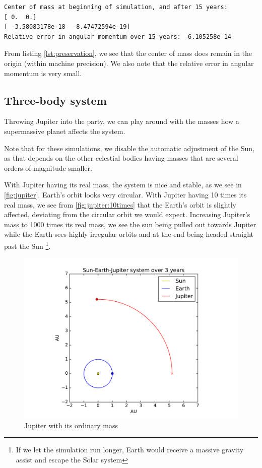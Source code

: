 \documentclass[a4paper]{article}
\begin{document}
\begin{lstlisting}[basicstyle=\footnotesize, frame=single, label={lst:preservation},caption=Preservation of center of mass and angular momentum]
Center of mass at beginning of simulation, and after 15 years:
[ 0.  0.]
[ -3.58083178e-18  -8.47472594e-19]
Relative error in angular momentum over 15 years: -6.105258e-14
\end{lstlisting}

From listing \vref{lst:preservation}, we see that the center of mass does remain in the origin (within machine precision). We also note that the relative error in angular momentum is very small.

\subsection{Three-body system}
Throwing Jupiter into the party, we can play around with the masses how a supermassive planet affects the system.

Note that for these simulations, we disable the automatic adjustment of the Sun, as that depends on the other celestial bodies having masses that are several orders of magnitude smaller.

With Jupiter having its real mass, the system is nice and stable, as we see in \vref{fig:jupiter}. Earth's orbit looks very circular.
With Jupiter having 10 times its real mass, we see from \vref{fig:jupiter:10times} that the Earth's orbit is slightly affected, deviating from the circular orbit we would expect. Increasing Jupiter's mass to 1000 times its real mass, we see the sun being pulled out towards Jupiter while the Earth sees highly irregular orbits and at the end being headed straight past the Sun \footnote{If we let the simulation run longer, Earth would receive a massive gravity assist and escape the Solar system}.

\begin{figure}[htb]
\includegraphics[width=\textwidth]{fig/jupitermass_1.pdf}
\caption{Jupiter with its ordinary mass}
\label{fig:jupiter}
\end{figure}
\end{document}
